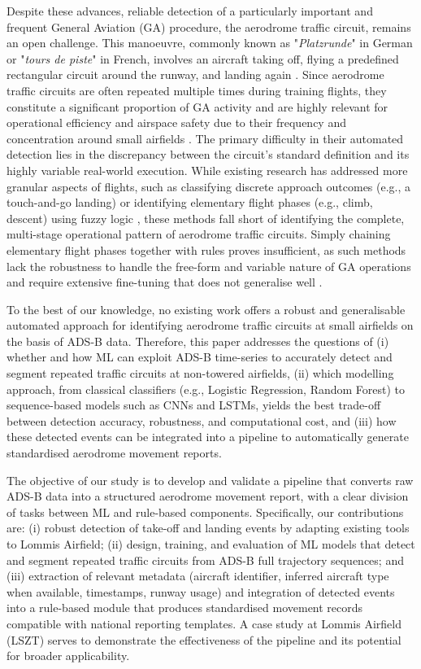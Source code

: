 \documentclass[
  manuscript=proceedings,  %
  layout=preprint,         %
  year=2025,
  volume=x,
]{extra/joas}
\begin{document}
Despite these advances, reliable detection of a particularly important and frequent General Aviation (GA) procedure, the aerodrome traffic circuit, remains an open challenge. This manoeuvre, commonly known as "\textit{Platzrunde}" in German or "\textit{tours de piste}" in French, involves an aircraft taking off, flying a predefined rectangular circuit around the runway, and landing again \cite{icao4444}. Since aerodrome traffic circuits are often repeated multiple times during training flights, they constitute a significant proportion of GA activity and are highly relevant for operational efficiency and airspace safety due to their frequency and concentration around small airfields \cite{patrikar2022}. The primary difficulty in their automated detection lies in the discrepancy between the circuit's standard definition and its highly variable real-world execution. While existing research has addressed more granular aspects of flights, such as classifying discrete approach outcomes (e.g., a touch-and-go landing) \cite{karboviak2018} or identifying elementary flight phases (e.g., climb, descent) using fuzzy logic \cite{flight_phase_sun}, these methods fall short of identifying the complete, multi-stage operational pattern of aerodrome traffic circuits. Simply chaining elementary flight phases together with rules proves insufficient, as such methods lack the robustness to handle the free-form and variable nature of GA operations and require extensive fine-tuning that does not generalise well \cite{fala_ml_2023}.

To the best of our knowledge, no existing work offers a robust and generalisable automated approach for identifying aerodrome traffic circuits at small airfields on the basis of ADS-B data. Therefore, this paper addresses the questions of (i) whether and how ML can exploit ADS-B time-series to accurately detect and segment repeated traffic circuits at non-towered airfields, (ii) which modelling approach, from classical classifiers (e.g., Logistic Regression, Random Forest) to sequence-based models such as CNNs and LSTMs, yields the best trade-off between detection accuracy, robustness, and computational cost, and (iii) how these detected events can be integrated into a pipeline to automatically generate standardised aerodrome movement reports.

The objective of our study is to develop and validate a pipeline that converts raw ADS-B data into a structured aerodrome movement report, with a clear division of tasks between ML and rule-based components. Specifically, our contributions are: (i) robust detection of take-off and landing events by adapting existing tools to Lommis Airfield; (ii) design, training, and evaluation of ML models that detect and segment repeated traffic circuits from ADS-B full trajectory sequences; and (iii) extraction of relevant metadata (aircraft identifier, inferred aircraft type when available, timestamps, runway usage) and integration of detected events into a rule-based module that produces standardised movement records compatible with national reporting templates. A case study at Lommis Airfield (LSZT) serves to demonstrate the effectiveness of the pipeline and its potential for broader applicability.
\end{document}
